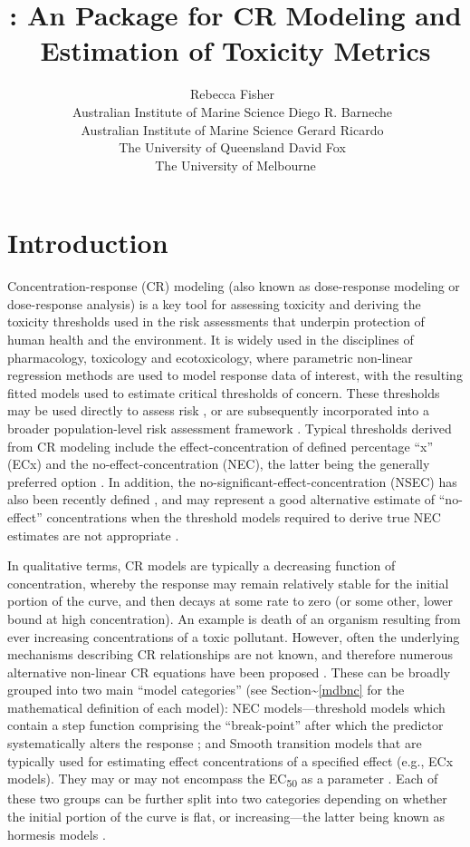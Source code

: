 \documentclass[
  shortnames]{jss}
\author{
Rebecca Fisher~\orcidlink{0000-0001-5148-6731}\\Australian Institute of Marine Science \And Diego R. Barneche~\orcidlink{0000-0002-4568-2362}\\Australian Institute of Marine Science \And Gerard Ricardo~\orcidlink{0000-0002-7761-0806}\\The University of Queensland \And David Fox~\orcidlink{0000-0002-3178-7243}\\The University of Melbourne
}
\title{\pkg{bayesnec}: An \proglang{R} Package for CR Modeling and Estimation of Toxicity Metrics}
\begin{document}
\hypertarget{introduction}{%
\section{Introduction}\label{introduction}}

Concentration-response (CR) modeling (also known as dose-response modeling or dose-response analysis) is a key tool for assessing toxicity and deriving the toxicity thresholds used in the risk assessments that underpin protection of human health and the environment. It is widely used in the disciplines of pharmacology, toxicology and ecotoxicology, where parametric non-linear regression methods are used to model response data of interest, with the resulting fitted models used to estimate critical thresholds of concern. These thresholds may be used directly to assess risk \citep[e.g., see][]{fisher2018c}, or are subsequently incorporated into a broader population-level risk assessment framework \citep[e.g.,][]{Warne2015}. Typical thresholds derived from CR modeling include the effect-concentration of defined percentage ``x'' (ECx) and the no-effect-concentration (NEC), the latter being the generally preferred option \citep{Fox2008, Warne2015, Warne2018c}. In addition, the no-significant-effect-concentration (NSEC) has also been recently defined \citep{Fisher2023}, and may represent a good alternative estimate of ``no-effect'' concentrations when the threshold models required to derive true NEC estimates are not appropriate \citep{Fisher2023, fisher2023ieam}.

In qualitative terms, CR models are typically a decreasing function of concentration, whereby the response may remain relatively stable for the initial portion of the curve, and then decays at some rate to zero (or some other, lower bound at high concentration). An example is death of an organism resulting from ever increasing concentrations of a toxic pollutant. However, often the underlying mechanisms describing CR relationships are not known, and therefore numerous alternative non-linear CR equations have been proposed \citep[e.g., models in ,][]{Ritz2016}. These can be broadly grouped into two main ``model categories'' (see Section\textasciitilde{}\ref{mdbnc} for the mathematical definition of each model): NEC models---threshold models which contain a step function comprising the ``break-point'' after which the predictor systematically alters the response \citep{Fox2010}; and Smooth transition models that are typically used for estimating effect concentrations of a specified effect (e.g., ECx models). They may or may not encompass the EC\textsubscript{50} as a parameter \citep{Ritz2016}. Each of these two groups can be further split into two categories depending on whether the initial portion of the curve is flat, or increasing---the latter being known as hormesis models \citep{Ritz2016}.
\end{document}
